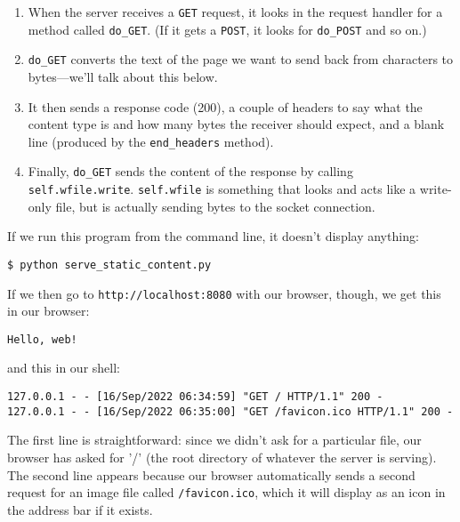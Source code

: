 \documentclass{scrbook}
\begin{document}
\begin{enumerate}

\item When the server receives a \texttt{GET} request,
    it looks in the request handler for a method called \texttt{do\_GET}.
    (If it gets a \texttt{POST}, it looks for \texttt{do\_POST} and so on.)

\item \texttt{do\_GET} converts the text of the page we want to send back
    from characters to bytes—we'll talk about this below.

\item It then sends a response code (200),
    a couple of headers to say what the content type is
    and how many bytes the receiver should expect,
    and a blank line (produced by the \texttt{end\_headers} method).

\item Finally, \texttt{do\_GET} sends the content of the response
    by calling \texttt{self.wfile.write}.
    \texttt{self.wfile} is something that looks and acts like a write-only file,
    but is actually sending bytes to the socket connection.

\end{enumerate}


If we run this program from the command line,
it doesn't display anything:

\begin{lstlisting}[frame=single,frameround=tttt]
$ python serve_static_content.py
\end{lstlisting}


If we then go to \texttt{http://localhost:8080} with our browser,
though,
we get this in our browser:

\begin{lstlisting}[frame=single,frameround=tttt]
Hello, web!
\end{lstlisting}


and this in our shell:

\begin{lstlisting}[frame=single,frameround=tttt]
127.0.0.1 - - [16/Sep/2022 06:34:59] "GET / HTTP/1.1" 200 -
127.0.0.1 - - [16/Sep/2022 06:35:00] "GET /favicon.ico HTTP/1.1" 200 -
\end{lstlisting}


The first line is straightforward:
since we didn't ask for a particular file,
our browser has asked for '/' (the root directory of whatever the server is serving).
The second line appears because
our browser automatically sends a second request
for an image file called \texttt{/favicon.ico},
which it will display as an icon in the address bar if it exists.
\end{document}
